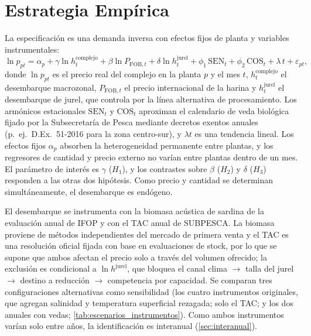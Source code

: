 \documentclass[11pt]{article}
\begin{document}
\section{Estrategia Empírica}\label{sec:strategy}
La especificación es una demanda inversa con efectos fijos de planta y variables instrumentales:
\begin{equation}\label{eq:iv}
  \ln p_{pt} = \alpha_p + \gamma \ln h_{t}^{\text{complejo}} + \beta \ln P_{\text{FOB},t}
              + \delta \ln h_{t}^{\text{jurel}} + \phi_1\,\mathrm{SEN}_t + \phi_2\,\mathrm{COS}_t
              + \lambda\, t + \varepsilon_{pt},
\end{equation}
donde $\ln p_{pt}$ es el precio real del complejo en la planta $p$ y el mes $t$, $h_t^{\text{complejo}}$ el desembarque macrozonal, $P_{\text{FOB},t}$ el precio internacional de la harina y $h_t^{\text{jurel}}$ el desembarque de jurel, que controla por la línea alternativa de procesamiento. Los armónicos estacionales $\mathrm{SEN}_t$ y $\mathrm{COS}_t$ aproximan el calendario de veda biológica fijado por la Subsecretaría de Pesca mediante decretos exentos anuales (p.\ ej.\ D.Ex.\ 51-2016 para la zona centro-sur), y $\lambda t$ es una tendencia lineal. Los efectos fijos $\alpha_p$ absorben la heterogeneidad permanente entre plantas, y los regresores de cantidad y precio externo no varían entre plantas dentro de un mes. El parámetro de interés es $\gamma$ ($H_1$), y los contrastes sobre $\beta$ ($H_2$) y $\delta$ ($H_3$) responden a las otras dos hipótesis. Como precio y cantidad se determinan simultáneamente, el desembarque es endógeno.

El desembarque se instrumenta con la biomasa acústica de sardina de la evaluación anual de IFOP y con el TAC anual de SUBPESCA. La biomasa proviene de métodos independientes del mercado de primera venta y el TAC es una resolución oficial fijada con base en evaluaciones de stock, por lo que se supone que ambos afectan el precio solo a través del volumen ofrecido; la exclusión es condicional a $\ln h^{\text{jurel}}$, que bloquea el canal clima $\rightarrow$ talla del jurel $\rightarrow$ destino a reducción $\rightarrow$ competencia por capacidad. Se comparan tres configuraciones alternativas como sensibilidad (los cuatro instrumentos originales, que agregan salinidad y temperatura superficial rezagada; solo el TAC; y los dos anuales con vedas; \autoref{tab:escenarios_instrumentos}). Como ambos instrumentos varían solo entre años, la identificación es interanual (\autoref{sec:interanual}).
\end{document}
